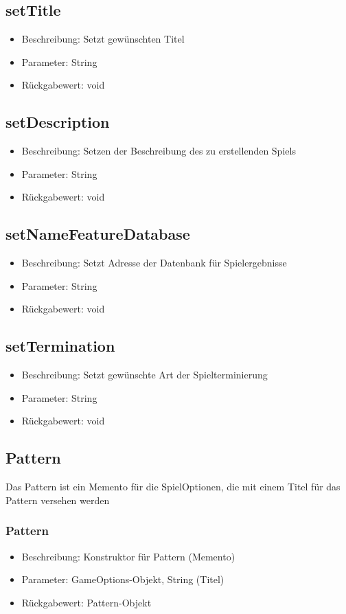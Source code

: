 \documentclass[a4paper]{scrreprt}
\begin{document}
	\subsection{setTitle}
	\begin{itemize}
		\item Beschreibung: Setzt gewünschten Titel
		\item Parameter: String
		\item Rückgabewert: void
	\end{itemize}
	\subsection{setDescription}
	\begin{itemize}
		\item Beschreibung: Setzen der Beschreibung des zu erstellenden Spiels
		\item Parameter: String
		\item Rückgabewert: void
	\end{itemize}
	\subsection{setNameFeatureDatabase}
	\begin{itemize}
		\item Beschreibung: Setzt Adresse der Datenbank für Spielergebnisse
		\item Parameter: String
		\item Rückgabewert: void
	\end{itemize}
	\subsection{setTermination}
	\begin{itemize}
		\item Beschreibung: Setzt gewünschte Art der Spielterminierung
		\item Parameter: String
		\item Rückgabewert: void
	\end{itemize}


	\subsection{Pattern}
	Das Pattern ist ein Memento für die SpielOptionen, die mit einem Titel für das Pattern versehen werden
	\subsubsection{Pattern}
	\begin{itemize}
		\item Beschreibung: Konstruktor für Pattern (Memento)
		\item Parameter: GameOptions-Objekt, String (Titel)
		\item Rückgabewert: Pattern-Objekt
	\end{itemize}
\end{document}
